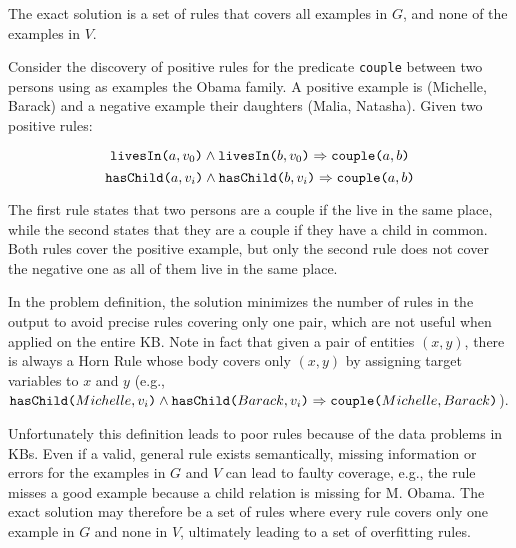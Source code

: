 The exact solution is a set of rules that covers all examples in $G$, and none of the examples in $V$. 

\begin{example}
	Consider the discovery of positive rules for the predicate {\tt couple} between two persons using as examples the Obama family. A positive example is (Michelle, Barack) and a negative example their daughters (Malia, Natasha). 
	Given two positive rules:
	
	\vspace{-2mm}	
	{\small	
		\begin{equation*}
			\texttt{livesIn(}a,v_0\texttt{)} \wedge \texttt{livesIn(}b,v_0\texttt{)} \Rightarrow  \texttt{couple(}a,b\texttt{)}  
		\end{equation*}
		\begin{equation*}
			\texttt{hasChild(}a,v_i\texttt{)} \wedge \texttt{hasChild(}b,v_i\texttt{)} \Rightarrow  \texttt{couple(}a,b\texttt{)}  
		\end{equation*}
	}
	\vspace{-3mm}	
	
	\noindent
	The first rule states that two persons are a couple if the live in the same place, while the second states that they are a couple if they have a child in common. Both rules cover the positive example, but only the second rule does not cover the negative one as all of them live in the same place. 
\end{example} 

\vspace{1ex}	
In the problem definition, the solution minimizes the number of rules in the output to avoid precise rules covering only one pair, which are not useful when applied on the entire KB. Note in fact that given a pair of entities $(x,y)$, there is always a Horn Rule whose body covers only $(x,y)$ by assigning target variables to $x$ and $y$ (e.g., {\small $\texttt{hasChild(}Michelle,v_i\texttt{)} \wedge \texttt{hasChild(}Barack,v_i\texttt{)} \Rightarrow  \texttt{couple(}Michelle,Barack\texttt{)}$}).


Unfortunately
this definition leads to poor rules because of the data problems in KBs. Even if a valid, general rule exists semantically, missing information or errors for the examples in $G$ and $V$ can lead to faulty coverage, e.g., the rule misses a good example because a child relation is missing for M. Obama. %
The exact solution may therefore be a set of rules where every rule covers only one example in $G$ and none in $V$, ultimately leading to a set of overfitting rules.

